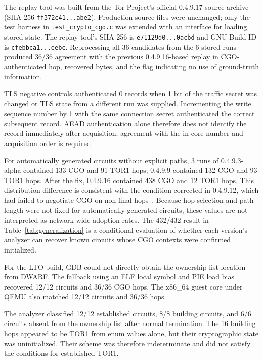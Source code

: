 \documentclass[10pt,a4paper]{article}
\newcommand{\code}[1]{\nolinkurl{#1}}
\newcommand{\torone}{\textsc{TOR1}}
\begin{document}
The replay tool was built from the Tor Project's official 0.4.9.17 source archive (SHA-256 \code{ff372c41...abe2}). Production source files were unchanged; only the test harness in \code{test_crypto_cgo.c} was extended with an interface for loading stored state. The replay tool's SHA-256 is \code{e71129d0...0acbd} and GNU Build ID is \code{cfebbca1...eebc}. Reprocessing all 36 candidates from the 6 stored runs produced 36/36 agreement with the previous 0.4.9.16-based replay in CGO-authenticated hop, recovered bytes, and the flag indicating no use of ground-truth information.

TLS negative controls authenticated 0 records when 1 bit of the traffic secret was changed or TLS state from a different run was supplied. Incrementing the write sequence number by 1 with the same connection secret authenticated the correct subsequent record. AEAD authentication alone therefore does not identify the record immediately after acquisition; agreement with the in-core number and acquisition order is required.

For automatically generated circuits without explicit paths, 3 runs of 0.4.9.3-alpha contained 133 CGO and 91 \torone{} hops; 0.4.9.9 contained 132 CGO and 93 \torone{} hops. After the fix, 0.4.9.16 contained 438 CGO and 12 \torone{} hops. This distribution difference is consistent with the condition corrected in 0.4.9.12, which had failed to negotiate CGO on non-final hops~\cite{torrelease04912}. Because hop selection and path length were not fixed for automatically generated circuits, these values are not interpreted as network-wide adoption rates. The 432/432 result in Table~\ref{tab:generalization} is a conditional evaluation of whether each version's analyzer can recover known circuits whose CGO contexts were confirmed initialized.

For the LTO build, GDB could not directly obtain the ownership-list location from DWARF. The fallback using an ELF local symbol and PIE load bias recovered 12/12 circuits and 36/36 CGO hops.
The x86\_64 guest core under QEMU also matched 12/12 circuits and 36/36 hops.


The analyzer classified 12/12 established circuits, 8/8 building circuits, and 6/6 circuits absent from the ownership list after normal termination.
The 16 building hops appeared to be \torone{} from enum values alone, but their cryptographic state was uninitialized. Their scheme was therefore indeterminate and did not satisfy the conditions for established \torone{}.
\end{document}
